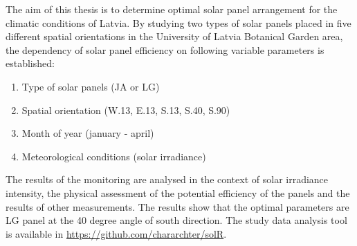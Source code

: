 The aim of this thesis is to determine optimal solar panel arrangement for the climatic conditions of Latvia.
By studying two types of solar panels placed in five different spatial orientations in the University of Latvia Botanical Garden area, the dependency of solar panel efficiency on following variable parameters is established:
\begin{enumerate}
\item Type of solar panels (JA or LG)
\item Spatial orientation (W.13, E.13, S.13, S.40, S.90)
\item Month of year (january - april)
\item Meteorological conditions (solar irradiance)
\end{enumerate}

The results of the monitoring are analysed in the context of solar irradiance intensity, the physical assessment of the potential efficiency of the panels and the results of other measurements.
The results show that the optimal parameters are LG panel at the 40 degree angle of south direction. The study data analysis tool is available in \url{https://github.com/chararchter/solR}.

